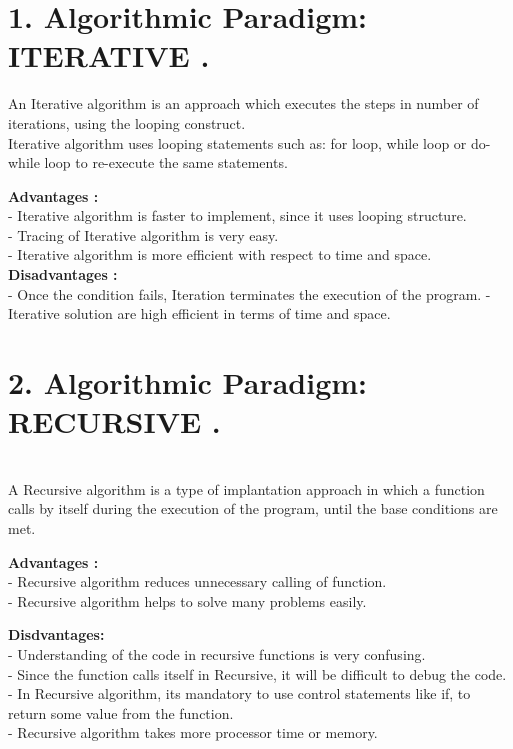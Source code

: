 \documentclass[10pt]{article}
\begin{document}
\section*{\normalsize \textbf{1. Algorithmic Paradigm: ITERATIVE .}}
\quad \quad An Iterative algorithm is an approach which executes the steps in number of iterations, using the looping construct.\\
\quad Iterative algorithm uses looping statements such as: for loop, while loop or do-while loop to re-execute the same statements.

\textbf{Advantages :}\\
- Iterative algorithm is faster to implement, since it uses looping structure.\\
- Tracing of Iterative algorithm is very easy.\\
- Iterative algorithm is more efficient with respect to time and space.\\

\textbf{Disadvantages :}\\
- Once the condition fails, Iteration terminates the execution of the program.
- Iterative solution are high efficient in terms of time and space.



\section*{\normalsize \textbf{2. Algorithmic Paradigm: RECURSIVE  .}}\\
\quad A Recursive algorithm is a type of implantation approach in which a function calls by itself during the execution of the program, until the base conditions are met.


\textbf{Advantages :}\\

- Recursive algorithm reduces unnecessary calling of function.\\
- Recursive algorithm helps to solve many problems easily.

\textbf{Disdvantages: }\\

- Understanding of the code in recursive functions is very confusing.\\
- Since the function calls itself in Recursive, it will be difficult to debug the code.\\
- In Recursive algorithm, its mandatory to use control statements like if, to return some value from the function.\\
- Recursive algorithm takes more processor time or memory.\\
\end{document}
